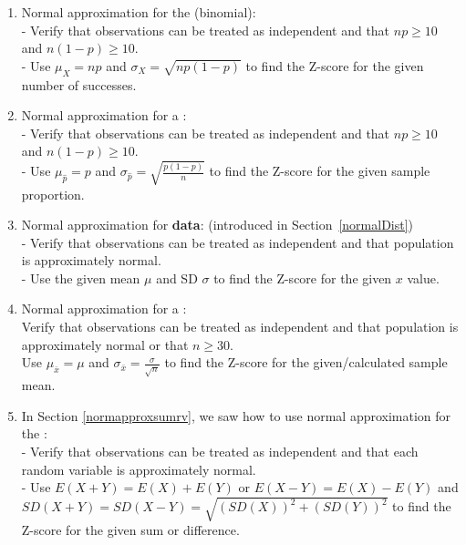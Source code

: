 \begin{enumerate}

\item Normal approximation for the  (binomial):  
\\- Verify that observations can be treated as independent and that $np\ge 10$ and $n(1-p)\ge 10$.
\\- Use $\mu_{\scriptscriptstyle{X}} = np$ and $\sigma_{\scriptscriptstyle{X}} = \sqrt{np(1-p)}$ to find the Z-score for the given number of successes.  

\item Normal approximation for a :  
\\- Verify that observations can be treated as independent and that $np\ge 10$ and $n(1-p)\ge 10$.
\\- Use $\mu_{\hat{p}} = p$ and $\sigma_{\hat{p}} = \sqrt{\frac{p(1-p)}{n}}$ to find the Z-score for the given sample proportion.

\item Normal approximation for \textbf{data}:  (introduced in Section~\ref{normalDist})
\\- Verify that observations can be treated as independent and that population is approximately normal.
\\- Use the given mean $\mu$ and SD $\sigma$ to find the Z-score for the given $x$ value.

\item Normal approximation for a :  
\\Verify that observations can be treated as independent and that population is approximately normal or that $n\ge 30$.
\\Use $\mu_{\bar{x}}=\mu$ and $\sigma_{\bar{x}}=\frac{\sigma}{\sqrt{n}}$ to find the Z-score for the given/calculated sample mean.

\item In Section \ref{normapproxsumrv}, we saw how to use normal approximation for the :
\\- Verify that observations can be treated as independent and that each random variable is approximately normal.
\\- Use $E(X+Y)=E(X)+E(Y)$ or $E(X-Y)=E(X)-E(Y)$ and $SD(X+Y)=SD(X-Y)=\sqrt{(SD(X))^2+(SD(Y))^2}$ to find the Z-score for the given sum or difference.

\end{enumerate}



